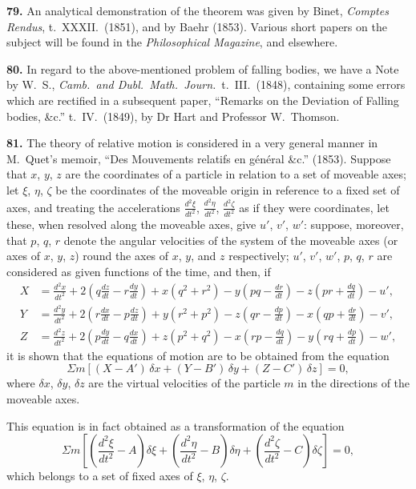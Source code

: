 \documentclass[11pt,a4paper]{book}
\begin{document}
\textbf{79.} An analytical demonstration of the theorem was given by Binet, \textit{Comptes Rendus}, t.~XXXII.~(1851), and by Baehr (1853). Various short papers on the subject will be found in the \textit{Philosophical Magazine}, and elsewhere.

\textbf{80.} In regard to the above-mentioned problem of falling bodies, we have a Note by W.~S., \textit{Camb.\ and Dubl.\ Math.\ Journ.}\ t.~III.~(1848), containing some errors which are rectified in a subsequent paper, ``Remarks on the Deviation of Falling bodies, \&c.'' t.~IV.~(1849), by Dr Hart and Professor W.~Thomson.

\textbf{81.} The theory of relative motion is considered in a very general manner in M.~Quet's memoir, ``Des Mouvements relatifs en g\'en\'eral \&c.'' (1853). Suppose that $x$, $y$, $z$ are the coordinates of a particle in relation to a set of moveable axes; let $\xi$, $\eta$, $\zeta$ be the coordinates of the moveable origin in reference to a fixed set of axes, and treating the accelerations $\frac{d^2\xi}{dt^2}$, $\frac{d^2\eta}{dt^2}$, $\frac{d^2\zeta}{dt^2}$ as if they were coordinates, let these, when resolved along the moveable axes, give $u'$, $v'$, $w'$: suppose, moreover, that $p$, $q$, $r$ denote the angular velocities of the system of the moveable axes (or axes of $x$, $y$, $z$) round the axes of $x$, $y$, and $z$ respectively; $u'$, $v'$, $w'$, $p$, $q$, $r$ are considered as given functions of the time, and then, if
\begin{align*}
X &= \frac{d^2x}{dt^2} + 2\left(q\frac{dz}{dt} - r\frac{dy}{dt}\right) + x(q^2 + r^2) - y\left(pq - \frac{dr}{dt}\right) - z\left(pr + \frac{dq}{dt}\right) - u', \\
Y &= \frac{d^2y}{dt^2} + 2\left(r\frac{dx}{dt} - p\frac{dz}{dt}\right) + y(r^2 + p^2) - z\left(qr - \frac{dp}{dt}\right) - x\left(qp + \frac{dr}{dt}\right) - v', \\
Z &= \frac{d^2z}{dt^2} + 2\left(p\frac{dy}{dt} - q\frac{dx}{dt}\right) + z(p^2 + q^2) - x\left(rp - \frac{dq}{dt}\right) - y\left(rq + \frac{dp}{dt}\right) - w',
\end{align*}
it is shown that the equations of motion are to be obtained from the equation
\[
\Sigma m \left[(X - A')\,\delta x + (Y - B')\,\delta y + (Z - C')\,\delta z\right] = 0,
\]
where $\delta x$, $\delta y$, $\delta z$ are the virtual velocities of the particle $m$ in the directions of the moveable axes.

This equation is in fact obtained as a transformation of the equation
\[
\Sigma m \left[\left(\frac{d^2\xi}{dt^2} - A\right)\delta\xi + \left(\frac{d^2\eta}{dt^2} - B\right)\delta\eta + \left(\frac{d^2\zeta}{dt^2} - C\right)\delta\zeta\right] = 0,
\]
which belongs to a set of fixed axes of $\xi$, $\eta$, $\zeta$.
\end{document}
